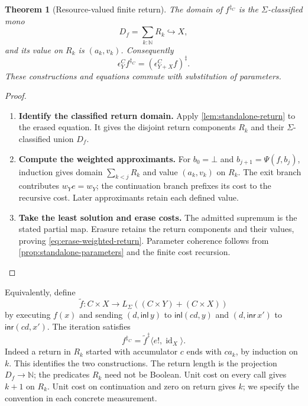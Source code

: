 \documentclass[11pt,a4paper]{article}
\numberwithin{algorithm}{section}
\numberwithin{equation}{section}
\newtheorem{theorem}{Theorem}[section]
\theoremstyle{definition}
\theoremstyle{remark}
\theoremstyle{plain}
\newcommand{\N}{\mathbb N}
\newcommand{\LL}{L_{\Sigma}}
\newcommand{\id}{\operatorname{id}}
\newcommand{\incl}{\hookrightarrow}
\newcommand{\pair}[2]{\langle #1,#2\rangle}
\theoremstyle{definition}
\theoremstyle{plain}
\begin{document}
\begin{theorem}[Resource-valued finite return]\label{thm:weighted-return}
The domain of $f^{\ddagger_C}$ is the $\Sigma$-classified mono
\[
 D_f=\sum_{k:\N}R_k\incl X,
\]
and its value on $R_k$ is $(a_k,v_k)$. Consequently
\begin{equation}\label{eq:erase-weighted-return}
 \epsilon^C_Y f^{\ddagger_C}
 =(\epsilon^C_{Y+X}f)^\ddagger.
\end{equation}
These constructions and equations commute with substitution of parameters.
\end{theorem}
\begin{proof}\leavevmode
\begin{enumerate}[leftmargin=*,align=left]
\item \textbf{Identify the classified return domain.}
Apply \cref{lem:standalone-return} to the erased equation.
It gives the disjoint return components $R_k$ and their
$\Sigma$-classified union $D_f$.

\item \textbf{Compute the weighted approximants.}
For $b_0=\bot$ and $b_{j+1}=\Psi(f,b_j)$, induction gives domain
$\sum_{k<j}R_k$ and value $(a_k,v_k)$ on $R_k$.
The exit branch contributes $w_Ye=w_Y$; the continuation branch
prefixes its cost to the recursive cost. Later approximants retain
each defined value.

\item \textbf{Take the least solution and erase costs.}
The admitted supremum is the stated partial map. Erasure retains
the return components and their values, proving
\eqref{eq:erase-weighted-return}. Parameter coherence follows from
\cref{prop:standalone-parameters} and the finite cost recursion.
\end{enumerate}
\end{proof}

Equivalently, define
\[
 \widetilde f:C\times X\to\LL((C\times Y)+(C\times X))
\]
by executing $f(x)$ and sending $(d,\mathsf{inl}\,y)$ to
$\mathsf{inl}(cd,y)$ and $(d,\mathsf{inr}\,x')$ to
$\mathsf{inr}(cd,x')$. The iteration satisfies
\[
 f^{\ddagger_C}=\widetilde f^\ddagger\pair{e!}{\id_X}.
\]
Indeed a return in $R_k$ started with accumulator $c$ ends with $ca_k$,
by induction on $k$. This identifies the two constructions. The return length is the projection
$D_f\to\N$; the predicates $R_k$ need not be Boolean. Unit cost on every
call gives $k+1$ on $R_k$. Unit cost on continuation and zero on return
gives $k$; we specify the convention in each concrete measurement.
\end{document}
